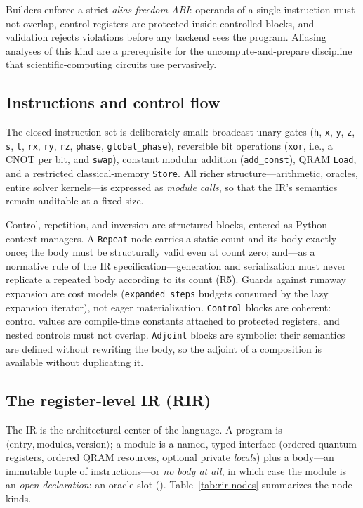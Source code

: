 Builders enforce a strict \emph{alias-freedom ABI}: operands of a single
instruction must not overlap, control registers are protected inside
controlled blocks, and validation rejects violations before any backend sees
the program.  Aliasing analyses of this kind are a prerequisite for the
uncompute-and-prepare discipline that scientific-computing circuits use
pervasively.

\subsection{Instructions and control flow}
\label{sec:instructions}

The closed instruction set is deliberately small: broadcast unary gates
(\texttt{h}, \texttt{x}, \texttt{y}, \texttt{z}, \texttt{s}, \texttt{t},
\texttt{rx}, \texttt{ry}, \texttt{rz}, \texttt{phase},
\texttt{global\_phase}), reversible bit operations (\texttt{xor}, i.e., a
CNOT per bit, and \texttt{swap}), constant modular addition
(\texttt{add\_const}), QRAM \texttt{Load}, and a restricted classical-memory
\texttt{Store}. All richer
structure---arithmetic, oracles, entire solver kernels---is expressed as
\emph{module calls}, so that the IR's semantics remain auditable at a fixed
size.

Control, repetition, and inversion are structured blocks, entered as Python
context managers.  A \texttt{Repeat} node carries a static count and its body
exactly once; the body must be structurally
valid even at count zero; and---as a normative rule of the IR
specification---generation and serialization must never replicate a repeated
body according to its count (R5).  Guards against runaway expansion are cost
models (\texttt{expanded\_steps} budgets consumed by the lazy expansion
iterator), not eager materialization.  \texttt{Control} blocks are coherent:
control values are compile-time constants attached to protected registers,
and nested controls must not overlap.  \texttt{Adjoint} blocks are symbolic:
their semantics are defined without rewriting the body, so the adjoint of a
composition is available without duplicating it.

\subsection{The register-level IR (RIR)}
\label{sec:rir}

The IR is the architectural center of the language.  A program is
$\langle\text{entry}, \text{modules}, \text{version}\rangle$; a module is a
named, typed interface (ordered quantum registers, ordered QRAM resources,
optional private \emph{locals}) plus a body---an immutable tuple of
instructions---or \emph{no body at all}, in which case the module is an
\emph{open declaration}: an oracle slot ().
Table~\ref{tab:rir-nodes} summarizes the node kinds.


